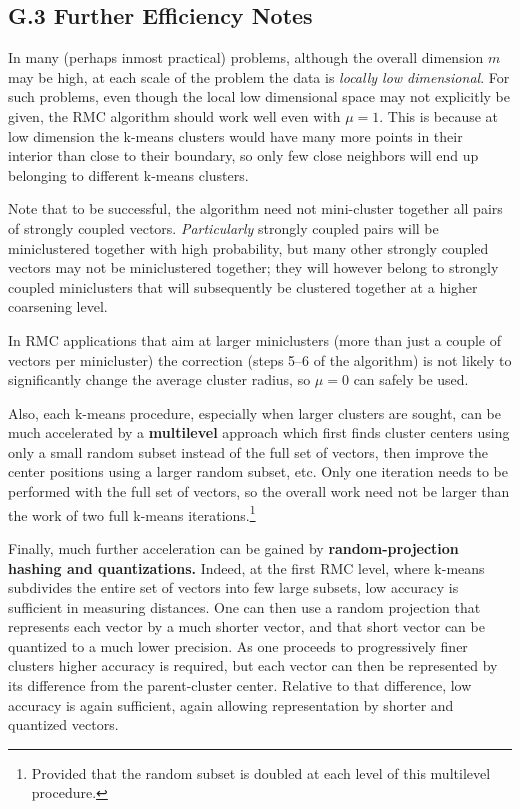 \documentclass{article} %
\begin{document}
\subsection{G.3 Further Efficiency Notes}
In many (perhaps inmost practical) problems, although the overall dimension $m$ may be high, at each scale of the problem the data is {\it locally low dimensional}. For such problems, even though the local low dimensional space may not explicitly be given, the RMC algorithm should work well even with $\mu = 1$. This is because at low dimension the k-means clusters would have many more points in their interior than close to their boundary, so only few close neighbors will end up belonging to different k-means clusters.

Note that to be successful, the algorithm need not mini-cluster together all pairs of strongly coupled vectors. {\it Particularly} strongly coupled pairs will be miniclustered together with high probability, but many other strongly coupled vectors may not be miniclustered together; they will however belong to strongly coupled miniclusters that will subsequently be clustered together at a higher coarsening level.

In RMC applications that aim at larger miniclusters (more than just a couple of vectors per minicluster) the correction (steps 5--6 of the algorithm) is not likely to significantly change the average cluster radius, so $\mu=0$ can safely be used.

Also, each k-means procedure, especially when larger clusters are sought, can be much accelerated by a {\bf multilevel} approach which first finds cluster centers using only a small random subset instead of the full set of vectors, then improve the center positions using a larger random subset, etc. Only one iteration needs to be performed with the full set of vectors, so the overall work need not be larger than the work of two full k-means iterations.\footnote{Provided that the random subset is doubled at each level of this multilevel procedure.}

Finally, much further acceleration can be gained by {\bf random-projection hashing and quantizations.} Indeed, at the first RMC level, where k-means subdivides the entire set of vectors into few large subsets, low accuracy is sufficient in measuring distances. One can then use a random projection that represents each vector by a much shorter vector, and that short vector can be quantized to a much lower precision. As one proceeds to progressively finer clusters higher accuracy is required, but each vector can then be represented by its difference from the parent-cluster center. Relative to that difference, low accuracy is again sufficient, again allowing representation by shorter and quantized vectors.
\end{document}
